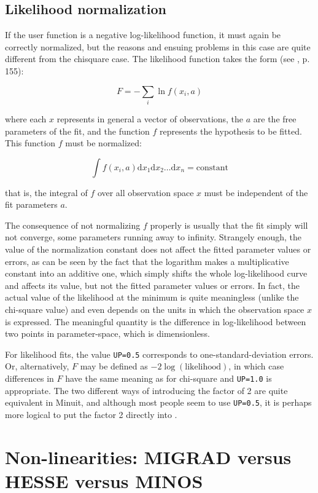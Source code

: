 \subsection{Likelihood normalization}

If the user function is a negative log-likelihood function, it must 
again be correctly normalized, but the reasons and ensuing problems 
in this case are quite different from the chisquare case. The 
likelihood function takes the form (see \cite{bib-EADIE}, p. 155):
 
\[ F = - \sum_{i} \ln f(x_i,a) \]
 
where each $x$ represents in general a vector of observations, the $a$ 
are the free parameters of the fit, and the function $f$ represents the 
hypothesis to be fitted. This function $f$ must be normalized:
 
\[ \int f(x_i,a) \mathrm{d}x_1 \mathrm{d}x_2 \ldots 
                 \mathrm{d}x_n = \mathrm{constant} \]
 
that is, the integral of $f$ over all observation space $x$ must be 
independent of the fit parameters $a$.
 
The consequence of not normalizing $f$ properly is usually that the fit 
simply will not converge, some parameters running away to infinity. 
Strangely enough, the value of the normalization constant does not 
affect the fitted parameter values or errors, as can be seen by the 
fact that the logarithm makes a multiplicative constant into an 
additive one, which simply shifts the whole log-likelihood curve and 
affects its value, but not the fitted parameter values or errors. In 
fact, the actual value of the likelihood at the minimum is quite 
meaningless (unlike the chi-square value) and even depends on the 
units in which the observation space $x$ is expressed. The meaningful 
quantity is the difference in log-likelihood between two points in 
parameter-space, which is dimensionless.
 
For likelihood fits, the value \texttt{UP=0.5} corresponds to 
one-standard-deviation errors. 
Or, alternatively, $F$ may be defined as $-2\log(\mathrm{likelihood})$, 
in which case differences in $F$ have the same meaning as for chi-square 
and \texttt{UP=1.0} is appropriate. The two different ways of introducing the 
factor of 2 are quite equivalent in Minuit, and although most people 
seem to use \texttt{UP=0.5}, it is perhaps more logical to put the 
factor 2 directly into .
 
\section{Non-linearities: MIGRAD versus HESSE versus MINOS}
\label{sec:errornonlin}

